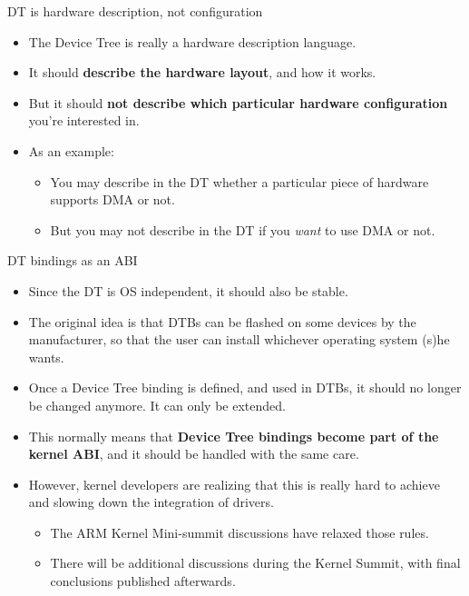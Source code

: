 \documentclass[obeyspaces,spaces,hyphens]{beamer}
\begin{document}
\begin{frame}{DT is hardware description, not configuration}
  \begin{itemize}
  \item The Device Tree is really a hardware description language.
  \item It should {\bf describe the hardware layout}, and how it works.
  \item But it should {\bf not describe which particular hardware
      configuration} you're interested in.
  \item As an example:
    \begin{itemize}
    \item You may describe in the DT whether a particular piece of hardware
      supports DMA or not.
    \item But you may not describe in the DT if you {\em want} to use
      DMA or not.
    \end{itemize}
  \end{itemize}
\end{frame}

\begin{frame}{DT bindings as an ABI}
  \begin{itemize}
  \item Since the DT is OS independent, it should also be stable.
  \item The original idea is that DTBs can be flashed on some devices
    by the manufacturer, so that the user can install whichever
    operating system (s)he wants.
  \item Once a Device Tree binding is defined, and used in DTBs, it
    should no longer be changed anymore. It can only be extended.
  \item This normally means that {\bf Device Tree bindings become part
      of the kernel ABI}, and it should be handled with the same care.
  \item However, kernel developers are realizing that this is really
    hard to achieve and slowing down the integration of drivers.
    \begin{itemize}
    \item The ARM Kernel Mini-summit discussions have relaxed those
      rules.
    \item There will be additional discussions during the Kernel
      Summit, with final conclusions published afterwards.
    \end{itemize}
  \end{itemize}
\end{frame}
\end{document}
